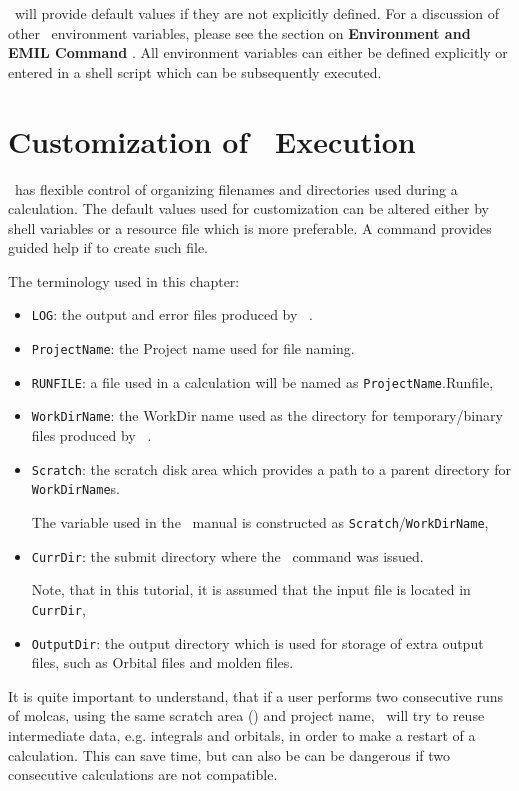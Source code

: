 \molcas\ will provide default values if they are not explicitly defined. For a discussion of other \molcas\
environment variables, please see the section on \textbf{Environment and EMIL Command} . All environment variables can
either be defined explicitly or entered in a shell script which can be subsequently executed.

\section{Customization of \molcas\ Execution}

\molcas\ has flexible control of organizing filenames and directories used during a calculation.
The default values used for customization can be altered either by shell variables or
a resource file \file{molcasrc} which is more preferable. A command 
provides guided help if to create such file.

The terminology used in this chapter:
\begin{itemize}
\item {\tt LOG}:  the output and error files  produced by \molcas\ .
\item {\tt ProjectName}:  the Project name used for file naming.
\item {\tt RUNFILE}: a file used in a calculation will be named as {\tt ProjectName}.Runfile,
\item {\tt WorkDirName}: the WorkDir name used as the directory for temporary/binary files produced by \molcas\ .
\item {\tt Scratch}: the scratch disk area which provides a path to a parent directory for {\tt WorkDirName}s.

The  variable used in the \molcas\ manual is constructed as {\tt Scratch}/{\tt WorkDirName},
\item {\tt CurrDir}: the submit directory where the \molcas\ command was issued.

Note, that in this tutorial, it is assumed that the input file is located in {\tt CurrDir},
\item {\tt OutputDir}: the output directory which is used for storage of extra output files, such as Orbital files and molden files.
\end{itemize}

It is quite important to understand, that if a user performs two consecutive runs of molcas, using the same
scratch area (\command{WorkDir}) and project name, \molcas\ will try to reuse intermediate data, e.g.
integrals and orbitals, in order to make a restart of a calculation. This can save time, but can also be
can be dangerous if two consecutive calculations are not compatible.

